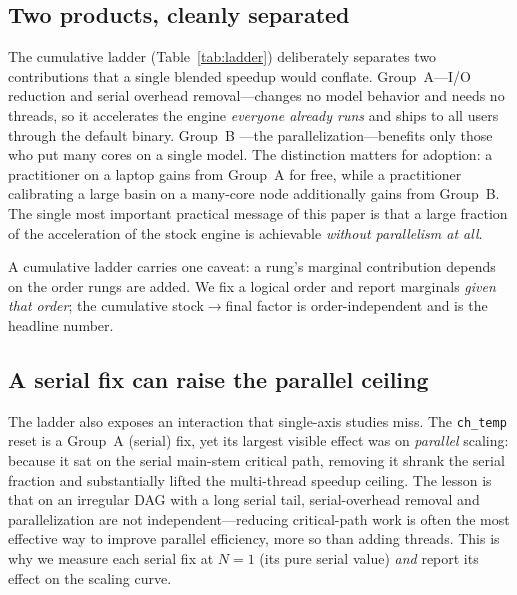 \subsection{Two products, cleanly separated}
The cumulative ladder (Table~\ref{tab:ladder}) deliberately separates two contributions that a
single blended speedup would conflate. Group~A---I/O reduction and serial overhead
removal---changes no model behavior and needs no threads, so it accelerates the engine
\emph{everyone already runs} and ships to all users through the default binary. Group~B
---the parallelization---benefits only those who put many cores on a single model. The
distinction matters for adoption: a practitioner on a laptop gains from Group~A for free, while a
practitioner calibrating a large basin on a many-core node additionally gains from Group~B. The
single most important practical message of this paper is that a large fraction of the
acceleration of the stock engine is achievable \emph{without parallelism at all}.

A cumulative ladder carries one caveat: a rung's marginal contribution depends on the order rungs
are added. We fix a logical order and report marginals \emph{given that order}; the cumulative
stock$\rightarrow$final factor is order-independent and is the headline number.

\subsection{A serial fix can raise the parallel ceiling}
The ladder also exposes an interaction that single-axis studies miss. The \texttt{ch\_temp}
reset is a Group~A (serial) fix, yet its largest visible effect was on \emph{parallel} scaling:
because it sat on the serial main-stem critical path, removing it shrank the serial fraction and
substantially lifted the multi-thread speedup ceiling. The lesson
is that on an irregular DAG with a long serial tail, serial-overhead removal and parallelization
are not independent---reducing critical-path work is often the most effective way to improve
parallel efficiency, more so than adding threads. This is why we measure each serial fix at
$N=1$ (its pure serial value) \emph{and} report its effect on the scaling curve.

